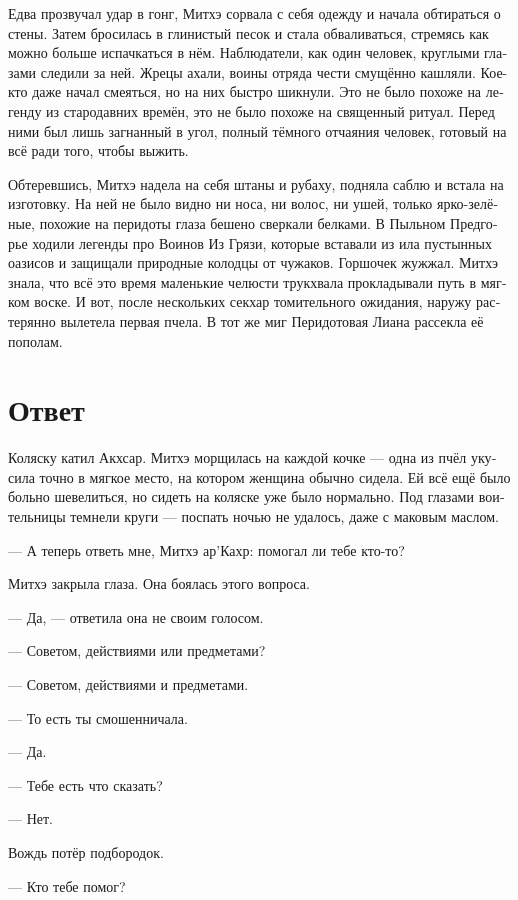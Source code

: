 \documentclass[a4paper,12pt,fleqn]{book}\usepackage{cooltooltips}\usepackage{polyglossia}\setdefaultlanguage{russian}\setotherlanguage{english}\defaultfontfeatures{Ligatures=TeX,Mapping=tex-text} \usepackage{xcolor}\definecolor{lightgray}{HTML}{bbbbbb}\color{lightgray}\newcommand{\ml}[3]{\textenglish{\textcolor{black}{#3}}}
\newcommand{\textspace}{\vspace{1em}{\centering\Large\bfseries<...>\par}\vspace{1em}}
\begin{document}
Едва прозвучал удар в гонг, Митхэ сорвала с себя одежду и начала обтираться о стены.
Затем бросилась в глинистый песок и стала обваливаться, стремясь как можно больше испачкаться в нём.
Наблюдатели, как один человек, круглыми глазами следили за ней.
Жрецы ахали, воины отряда чести смущённо кашляли.
Кое-кто даже начал смеяться, но на них быстро шикнули.
Это не было похоже на легенду из стародавних времён, это не было похоже на священный ритуал.
Перед ними был лишь загнанный в угол, полный тёмного отчаяния человек, готовый на всё ради того, чтобы выжить.

Обтеревшись, Митхэ надела на себя штаны и рубаху, подняла саблю и встала на изготовку.
На ней не было видно ни носа, ни волос, ни ушей, только ярко-зелёные, похожие на перидоты глаза бешено сверкали белками.
В Пыльном Предгорье ходили легенды про Воинов Из Грязи, которые вставали из ила пустынных оазисов и защищали природные колодцы от чужаков.
Горшочек жужжал.
Митхэ знала, что всё это время маленькие челюсти трукхвала прокладывали путь в мягком воске.
И вот, после нескольких секхар томительного ожидания, наружу растерянно вылетела первая пчела.
В тот же миг Перидотовая Лиана рассекла её пополам.

\section{Ответ}

Коляску катил Акхсар.
Митхэ морщилась на каждой кочке --- одна из пчёл укусила точно в мягкое место, на котором женщина обычно сидела.
Ей всё ещё было больно шевелиться, но сидеть на коляске уже было нормально.
Под глазами воительницы темнели круги --- поспать ночью не удалось, даже с маковым маслом.

\textspace

--- А теперь ответь мне, Митхэ ар'Кахр: помогал ли тебе кто-то?

Митхэ закрыла глаза.
Она боялась этого вопроса.

--- Да, --- ответила она не своим голосом.

--- Советом, действиями или предметами?

--- Советом, действиями и предметами.

--- То есть ты смошенничала.

--- Да.

--- Тебе есть что сказать?

--- Нет.

Вождь потёр подбородок.

--- Кто тебе помог?
\end{document}
